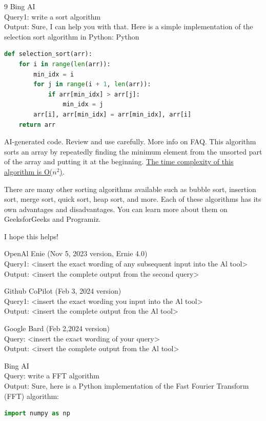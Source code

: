 \documentclass{mcmthesis}
\begin{document}
\begin{ReportAiUse}{9}
Bing AI\\
Query1: write a sort algorithm\\
Output: Sure, I can help you with that. Here is a simple implementation of the selection sort algorithm in Python:
 Python
\begin{lstlisting}[language=python]
def selection_sort(arr):
    for i in range(len(arr)):
        min_idx = i
        for j in range(i + 1, len(arr)):
            if arr[min_idx] > arr[j]:
                min_idx = j
        arr[i], arr[min_idx] = arr[min_idx], arr[i]
    return arr
\end{lstlisting}
 AI-generated code. Review and use carefully. More info on FAQ.
This algorithm sorts an array by repeatedly finding the minimum element from the unsorted part of the array and putting it at the beginning. \href{https://www.geeksforgeeks.org/sorting-algorithms/}{The time complexity of this algorithm is O($n^2$)}.

There are many other sorting algorithms available such as bubble sort, insertion sort, merge sort, quick sort, heap sort, and more. Each of these algorithms has its own advantages and disadvantages. You can learn more about them on GeeksforGeeks and Programiz.

I hope this helps!

OpenAl Enie (Nov 5, 2023 version, Ernie 4.0)\\
Query1: <insert the exact wording of any subsequent input into the Al tool>\\
Output: <insert the complete output from the second query>

Github CoPilot (Feb 3, 2024 version)\\
Query1: <insert the exact wording you input into the Al tool>\\
Output: <insert the complete output fron the Al tool>

Google Bard (Feb 2,2024 version)\\
Query: <insert the exact wording of your query>\\
Output: <irsert the complete output from the Al tool>

Bing AI\\
Query: write a FFT algorithm\\
Output: Sure, here is a Python implementation of the Fast Fourier Transform (FFT) algorithm:
\begin{lstlisting}[language=python]
import numpy as np


\end{lstlisting}
\end{ReportAiUse}
\end{document}
